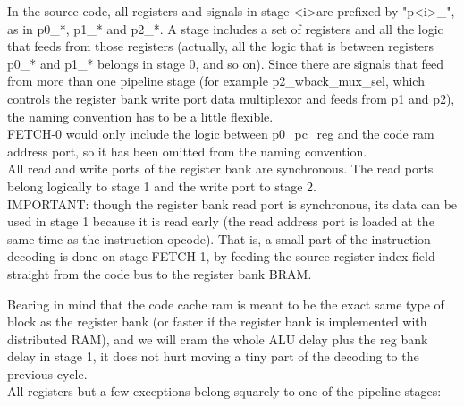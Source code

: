     In the source code, all registers and signals in stage 
    \textless i\textgreater  are prefixed by 
    "p\textless i\textgreater\_", as in p0\_*, p1\_* and p2\_*. 
    A stage includes a set of registers and 
    all the logic that feeds from those registers (actually, all the logic
    that is between registers p0\_* and p1\_* belongs in stage 0, and so on).
    Since there are signals that feed from more than one pipeline stage (for
    example p2\_wback\_mux\_sel, which controls the register bank write port 
    data multiplexor and feeds from p1 and p2), the naming convention has to be
    a little flexible.\\
    
    FETCH-0 would only include the logic between p0\_pc\_reg and the code ram 
    address port, so it has been omitted from the naming convention.\\
    
    All read and write ports of the register bank are synchronous. The read 
    ports belong logically to stage 1 and the write port to stage 2.\\
    
    IMPORTANT: though the register bank read port is synchronous, its data can
    be used in stage 1 because it is read early (the read address port is loaded at the 
    same time as the instruction opcode). That is, a small part of the 
    instruction decoding is done on stage FETCH-1, by feeding the source 
    register index field straight from the code bus to the register bank BRAM. 
    
    Bearing in mind that the code cache 
    ram is meant to be the exact same type of block as the register bank (or 
    faster if the register bank is implemented with distributed RAM), and we 
    will cram the whole ALU delay plus the reg bank delay in stage 1, it does 
    not hurt moving a tiny part of the decoding to the previous cycle.\\
    
    All registers but a few exceptions belong squarely to one of the pipeline
    stages:\\
    
